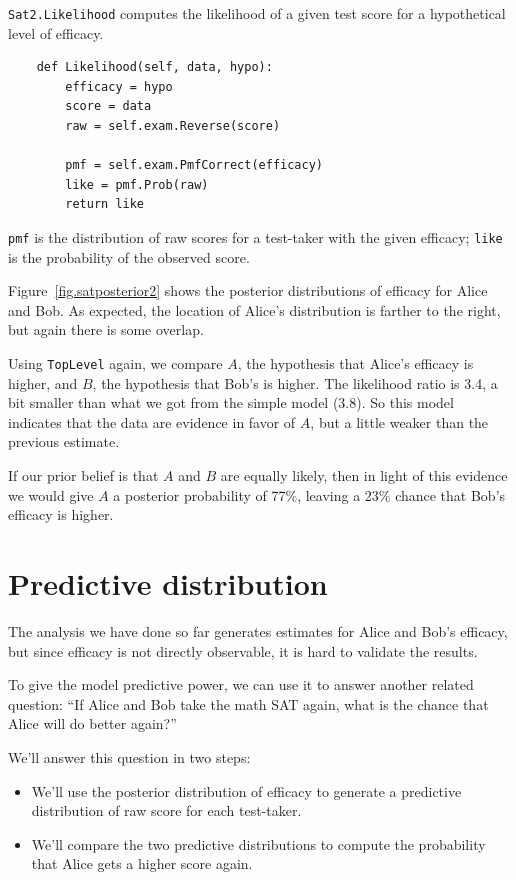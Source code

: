 \documentclass[12pt]{book}
\begin{document}
\verb"Sat2.Likelihood" computes the likelihood of a given test score
for a hypothetical level of efficacy.

\begin{verbatim}
    def Likelihood(self, data, hypo):
        efficacy = hypo
        score = data
        raw = self.exam.Reverse(score)

        pmf = self.exam.PmfCorrect(efficacy)
        like = pmf.Prob(raw)
        return like
\end{verbatim}

{\tt pmf} is the distribution of raw scores for a test-taker
with the given efficacy; {\tt like} is the probability of
the observed score.

Figure~\ref{fig.satposterior2} shows the posterior distributions
of efficacy for Alice and Bob.  As expected, the location
of Alice's distribution is farther to the right, but again there
is some overlap.

Using {\tt TopLevel} again, we compare $A$, the
hypothesis that Alice's efficacy is higher, and $B$, the
hypothesis that Bob's is higher.  The likelihood ratio is
3.4, a bit smaller than what we got from the simple model (3.8).
So this model indicates that the data are evidence in favor
of $A$, but a little weaker than the previous estimate.

If our prior belief is that $A$ and $B$ are equally likely,
then in light of this evidence we would give $A$ a posterior
probability of 77\%, leaving a 23\% chance that Bob's efficacy
is higher.


\section{Predictive distribution}

The analysis we have done so far generates estimates for
Alice and Bob's efficacy, but since efficacy is not directly
observable, it is hard to validate the results.

To give the model predictive power, we can use it to answer
another related question: ``If Alice and Bob take the math SAT
again, what is the chance that Alice will do better again?''

We'll answer this question in two steps:

\begin{itemize}

\item We'll use the posterior distribution of efficacy to
generate a predictive distribution of raw score for each test-taker.

\item We'll compare the two predictive distributions to compute
the probability that Alice gets a higher score again.

\end{itemize}
\end{document}
